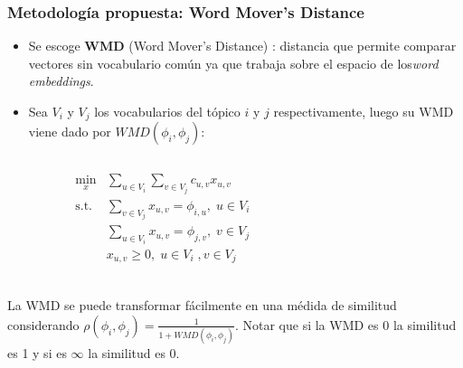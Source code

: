 \documentclass[
	spanish, %
	aspectratio=43, %
	hyperref={pdfencoding=auto,psdextra},
	xcolor={dvipsnames,table,usenames},
]{beamer}
\begin{document}
\begin{frame}[t]
\frametitle{Metodología propuesta: Word Mover's Distance}
  \begin{itemize}
    \item Se escoge \textbf{WMD} (Word Mover's Distance) \cite{kusner2015word}: distancia que permite comparar vectores sin vocabulario común ya que trabaja sobre el espacio de los\textit{word embeddings}. 
    \item Sea  $V_{i}$ y $V_{j}$ los vocabularios del tópico $i$ y $j$ respectivamente, luego su WMD viene dado por $WMD(\phi_{i}, \phi_{j})$:
  \end{itemize}

\vspace*{-0.3in}
\begin{columns}
\begin{column}{0.4\textwidth}

\begin{align}
\underset{x}{\text{min}}&\sum_{u \in V_{i}}\sum_{v \in V_{j}} c_{u,v}x_{u,v} \\ 
\textrm{s.t.} &\sum_{v \in V_{j}}x_{u,v}= \phi_{i,u}, \; u \in V_{i}\\ 
& \sum_{u \in V_{i}}x_{u,v}= \phi_{j,v}, \; v\in V_{j}\\
& x_{u,v} \geq 0,\; u \in V_{i} \;, v \in V_{j}\\ \nonumber
\end{align}

\end{column}

\begin{column}{0.6\textwidth}
\end{column}

\end{columns}
La WMD se puede transformar fácilmente en una médida de similitud considerando $\rho(\phi_{i}, \phi_{j}) = \frac{1}{1+WMD(\phi_{i}, \phi_{j})}$. Notar que si la WMD es 0 la similitud es 1 y si es $\infty$ la similitud es 0. \\

\end{frame}
\end{document}
